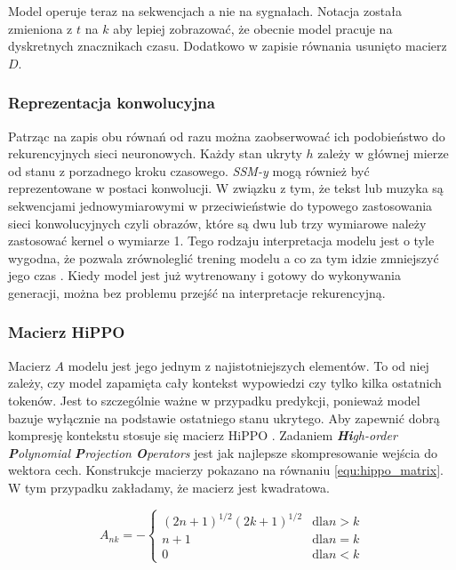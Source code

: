 \documentclass[data-science]{agh-wi} %
\begin{document}
Model operuje teraz na sekwencjach a nie na sygnałach. Notacja została zmieniona z $t$ na $k$ aby lepiej zobrazować, że obecnie model pracuje na dyskretnych znacznikach czasu. Dodatkowo w zapisie równania usunięto macierz $D$.

\subsubsection*{Reprezentacja konwolucyjna}
Patrząc na zapis obu równań od razu można zaobserwować ich podobieństwo do rekurencyjnych sieci neuronowych. Każdy stan ukryty $h$ zależy w głównej mierze od stanu z porzadnego kroku czasowego. \textit{SSM-y} mogą również być reprezentowane w postaci konwolucji. W związku z tym, że tekst lub muzyka są sekwencjami jednowymiarowymi w przeciwieństwie do typowego zastosowania sieci konwolucyjnych czyli obrazów, które są dwu lub trzy wymiarowe należy zastosować kernel o wymiarze 1. Tego rodzaju interpretacja modelu jest o tyle wygodna, że pozwala zrównoleglić trening modelu a co za tym idzie zmniejszyć jego czas \cite{ssm_notacja}. Kiedy model jest już wytrenowany i gotowy do wykonywania generacji, można bez problemu przejść na interpretacje rekurencyjną.

\subsubsection*{Macierz HiPPO}
Macierz $A$ modelu jest jego jednym z najistotniejszych elementów. To od niej zależy, czy model zapamięta cały kontekst wypowiedzi czy tylko kilka ostatnich tokenów. Jest to szczególnie ważne w przypadku predykcji, ponieważ model bazuje wyłącznie na podstawie ostatniego stanu ukrytego. Aby zapewnić dobrą kompresję kontekstu stosuje się macierz HiPPO \cite{hippo}. Zadaniem \textit{\textbf{Hi}gh-order \textbf{P}olynomial \textbf{P}rojection \textbf{O}perators} jest jak najlepsze skompresowanie wejścia do wektora cech. Konstrukcje macierzy pokazano na równaniu \ref*{equ:hippo_matrix}. W tym przypadku zakładamy, że macierz jest kwadratowa.

\begin{equation}
    A_{nk} = -
    \begin{cases}
        (2n + 1)^{1/2} (2k + 1)^{1/2} & \text{dla} n > k \\
        n + 1                         & \text{dla} n = k \\
        0                             & \text{dla} n < k
    \end{cases}
    \label{equ:hippo_matrix}
\end{equation}
\end{document}
